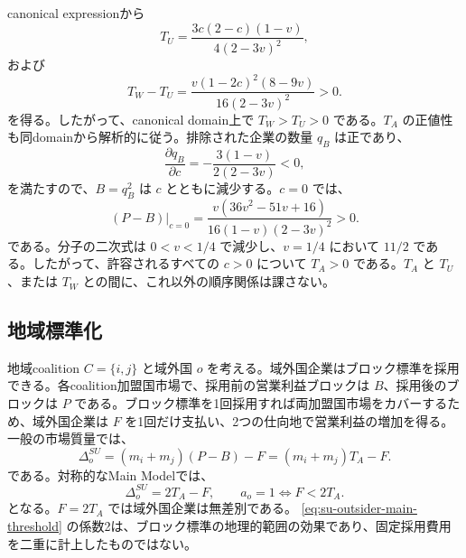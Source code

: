 canonical expressionから
\begin{equation}
    T_U
    =\frac{3c(2-c)(1-v)}{4(2-3v)^2},
    \label{eq:TU-closed-form}
\end{equation}
および
\begin{equation}
    T_W-T_U
    =\frac{v(1-2c)^2(8-9v)}{16(2-3v)^2}>0.
    \label{eq:TW-minus-TU}
\end{equation}
を得る。したがって、canonical domain上で $T_W>T_U>0$ である。$T_A$ の正値性も同domainから解析的に従う。排除された企業の数量 $q_B$ は正であり、
\begin{equation}
    \frac{\partial q_B}{\partial c}
    =-\frac{3(1-v)}{2(2-3v)}<0,
    \label{eq:qB-c-derivative}
\end{equation}
を満たすので、$B=q_B^2$ は $c$ とともに減少する。$c=0$ では、
\begin{equation}
    \left.(P-B)\right|_{c=0}
    =\frac{v(36v^2-51v+16)}{16(1-v)(2-3v)^2}>0.
    \label{eq:TA-at-zero-c}
\end{equation}
である。分子の二次式は $0<v<1/4$ で減少し、$v=1/4$ において $11/2$ である。したがって、許容されるすべての $c>0$ について $T_A>0$ である。$T_A$ と $T_U$、または $T_W$ との間に、これ以外の順序関係は課さない。

\subsection{地域標準化}
\label{subsec:private-su}

地域coalition $C=\{i,j\}$ と域外国 $o$ を考える。域外国企業はブロック標準を採用できる。各coalition加盟国市場で、採用前の営業利益ブロックは $B$、採用後のブロックは $P$ である。ブロック標準を1回採用すれば両加盟国市場をカバーするため、域外国企業は $F$ を1回だけ支払い、2つの仕向地で営業利益の増加を得る。一般の市場質量では、
\begin{equation}
    \Delta_o^{SU}
    =(m_i+m_j)(P-B)-F
    =(m_i+m_j)T_A-F.
    \label{eq:su-outsider-adoption-gain}
\end{equation}
である。対称的なMain Modelでは、
\begin{equation}
    \Delta_o^{SU}=2T_A-F,
    \qquad
    a_o=1\iff F<2T_A.
    \label{eq:su-outsider-main-threshold}
\end{equation}
となる。$F=2T_A$ では域外国企業は無差別である。
\eqref{eq:su-outsider-main-threshold} の係数2は、ブロック標準の地理的範囲の効果であり、固定採用費用を二重に計上したものではない。

